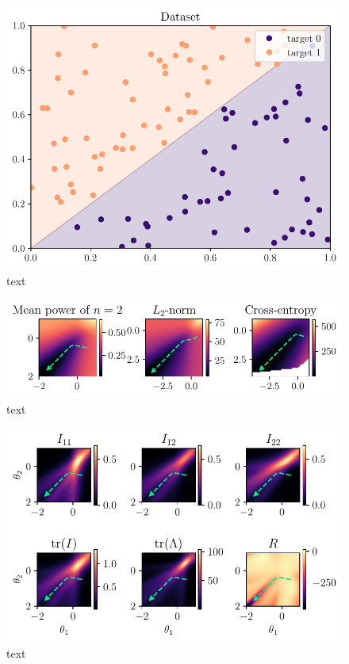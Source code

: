\begin{figure}
	\centering
	\includegraphics{Experiment2/plots/Dataset.pdf}
	\caption{text}
\end{figure}

\begin{figure}
	\centering
	\includegraphics{Experiment2/plots/LossSurfaces.pdf}
	\caption{text}
\end{figure}

\begin{figure}
	\centering
	\includegraphics{Experiment2/plots/MeanPowerLoss2_tracecomparison.pdf}
	\caption{text}
\end{figure}

